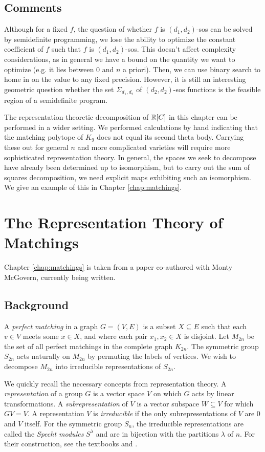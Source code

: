 \subsection{Comments}
Although for a fixed $f$, the question of whether $f$ is $(d_1,d_2)$-sos can be solved by semidefinite programming, we lose the ability to optimize the constant coefficient of $f$ such that $f$ is $(d_1,d_2)$-sos.
This doesn't affect complexity considerations, as in general we have a bound on the quantity we want to optimize (e.g. it lies between 0 and $n$ a priori).
Then, we can use binary search to home in on the value to any fixed precision.
However, it is still an interesting geometric question whether the set $\Sigma_{d_1,d_2}$ of $(d_2,d_2)$-sos functions is the feasible region of a semidefinite program.

The representation-theoretic decomposition of $\mathbb{R}[C]$ in this chapter can be performed in a wider setting.
We performed calculations by hand indicating that the matching polytope of $K_9$ does not equal its second theta body.
Carrying these out for general $n$ and more complicated varieties will require more sophisticated representation theory.
In general, the spaces we seek to decompose have already been determined up to isomorphism, but to carry out the sum of squares decomposition, we need explicit maps exhibiting such an isomorphism.
We give an example of this in Chapter \ref{chap:matchings}.


\section{The Representation Theory of Matchings}
Chapter \ref{chap:matchings} is taken from a paper co-authored with Monty McGovern, currently being written.

\subsection{Background}
A {\em perfect matching} in a graph $G=(V,E)$ is a subset $X \subseteq E$ such that each $v \in V$ meets some $x \in X$, and where each pair $x_1,x_2 \in X$ is disjoint.
Let $M_{2n}$ be the set of all perfect matchings in the complete graph $K_{2n}$.
The symmetric group $S_{2n}$ acts naturally on $M_{2n}$ by permuting the labels of vertices.
We wish to decompose $M_{2n}$ into irreducible representations of $S_{2n}$.

We quickly recall the necessary concepts from representation theory.
A {\em representation} of a group $G$ is a vector space $V$ on which $G$ acts by linear transformations.
A {\em subrepresentation} of $V$ is a vector subspace $W \subseteq V$ for which $GV = V$.
A representation $V$ is {\em irreducible} if the only subrepresentations of $V$ are 0 and $V$ itself.
For the symmetric group $S_n$, the irreducible representations are called the {\em Specht modules} $S^\lambda$ and are in bijection with the partitions $\lambda$ of $n$.
For their construction, see the textbooks \cite{Sagan} and \cite{Fulton}.


